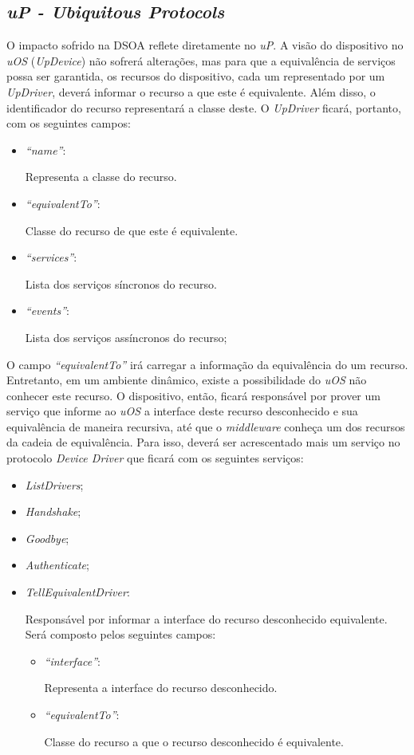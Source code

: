\subsection{\emph{uP - Ubiquitous Protocols}}

O impacto sofrido na DSOA reflete diretamente no \emph{uP}. A visão do dispositivo no \emph{uOS} (\emph{UpDevice}) não sofrerá alterações, mas para que a equivalência de serviços possa ser garantida, os recursos do dispositivo, cada um representado por um \emph{UpDriver}, deverá informar o recurso a que este é equivalente. Além disso, o identificador do recurso representará a classe deste. O \emph{UpDriver} ficará, portanto, com os seguintes campos:

\begin{itemize}
	\item \emph{``name''}:
		
		Representa a classe do recurso.

	\item \emph{``equivalentTo''}:
	
		Classe do recurso de que este é equivalente.
	\item \emph{``services''}:

		Lista dos serviços síncronos do recurso.

	\item \emph{``events''}:

		Lista dos serviços assíncronos do recurso;
\end{itemize}

O campo \emph{``equivalentTo''} irá carregar a informação da equivalência do um recurso. Entretanto, em um ambiente dinâmico, existe a possibilidade do \emph{uOS} não conhecer este recurso. O dispositivo, então, ficará responsável por prover um serviço que informe ao \emph{uOS} a interface deste recurso desconhecido e sua equivalência de maneira recursiva, até que o \emph{middleware} conheça um dos recursos da cadeia de equivalência. Para isso, deverá ser acrescentado mais um serviço no protocolo \emph{Device Driver} que ficará com os seguintes serviços:

\begin{itemize}
	\item \emph{ListDrivers};
	\item \emph{Handshake};
	\item \emph{Goodbye};
	\item \emph{Authenticate};
	\item \emph{TellEquivalentDriver}:

		Responsável por informar a interface do recurso desconhecido equivalente. Será composto pelos seguintes campos:

		\begin{itemize}
			\item \emph{``interface''}:

			Representa a interface do recurso desconhecido.

			\item \emph{``equivalentTo''}:

			Classe do recurso a que o recurso desconhecido é equivalente.
		\end{itemize}
\end{itemize}

